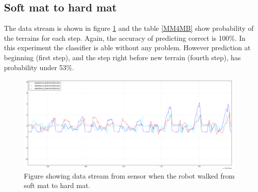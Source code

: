 \documentclass[USenglish]{ifimaster}  %
\begin{document}
\subsection{Soft mat to hard mat}
The data stream is shown in figure \ref{fig:MM_4_Resten_BGraf} and the table \ref{MM4MB} show probability of the terrains for each step. Again, the accuracy of predicting correct is 100\%. In this experiment the classifier is able without any problem. However prediction at beginning (first step), and the step right before new terrain (fourth step), has probability under 53\%.

\begin{figure}[h]
    \centering
    \includegraphics[width=\textwidth,height=\textheight,keepaspectratio]{Figures/MM_4Resten_MB}
    \caption{Figure showing data stream from sensor when the robot walked from soft mat to hard mat.}
    \label{fig:MM_4_Resten_BGraf}
\end{figure}

\begin{table}[h]
\centering
{}
\caption{The table showing probability of each terrain per step walking from soft mat to hard mat. Marked green represent correct prediction and correct terrain, red represent wrong prediction and yellow is the correct prediction if it got wrong.}
\label{MM4MB}
\end{table}
\FloatBarrier
\end{document}
